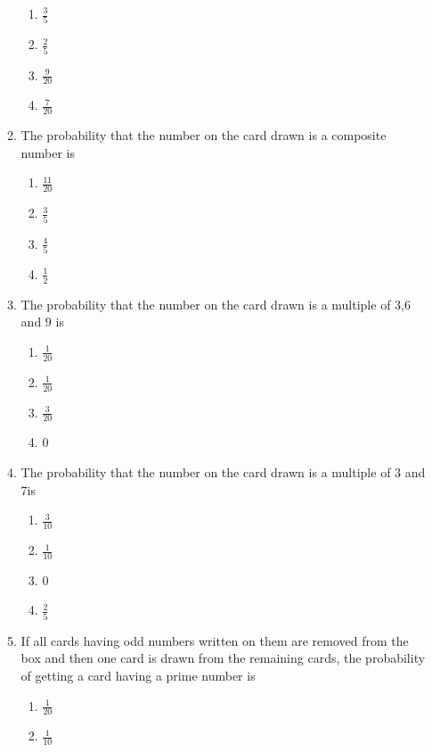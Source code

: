 \begin{enumerate}[label=\thesection.\arabic*.,ref=\thesection.\theenumi]
\begin{enumerate}[label=(\roman*)]
\begin{enumerate}[label=(\Alph*)]
          \item $\frac{3}{5}$
          \item $\frac{2}{5}$
          \item $\frac{9}{20}$                      
          \item $\frac{7}{20}$                                               \end{enumerate}
\item The probability that the number on the card drawn is a composite number is
\begin{enumerate}[label=(\Alph*)]
        \item $\frac{11}{20}$                     
	\item $\frac{3}{5}$                       
	\item $\frac{4}{5}$                     
	\item $\frac{1}{2}$
\end{enumerate}
\item The probability that the number on the card drawn is a multiple of $3$,$6$ and $9$ is
\begin{enumerate}[label=(\Alph*)]                 
	\item $\frac{1}{20}$                      
	\item $\frac{1}{20}$                      
	\item $\frac{3}{20}$                      
	\item $0$
\end{enumerate}
\item The probability that the number on the card drawn is a multiple of $3$ and $7$is
\begin{enumerate}[label=(\Alph*)]                 
	\item $\frac{3}{10}$                      
	\item $\frac{1}{10}$                      
	\item $0$
        \item $\frac{2}{5}$               
\end{enumerate}                                                              \item If all cards having odd numbers written on them are removed from the box and then one card is drawn from the remaining cards, the probability of getting a card having a prime number is
\begin{enumerate}[label=(\Alph*)]                 
	\item $\frac{1}{20}$
	\item $\frac{1}{10}$                      

\end{enumerate}
\end{enumerate}
\end{enumerate}
